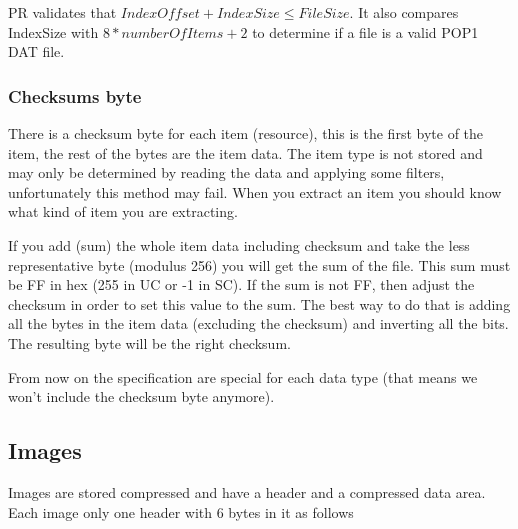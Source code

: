 \documentclass{article}
\begin{document}

%
%

  PR validates that $IndexOffset+IndexSize \le FileSize$.
 It also compares IndexSize with $8*numberOfItems+2$ to determine if a file
  is a valid POP1 DAT file.

\subsubsection{Checksums byte}

 There is a  checksum byte for each item (resource), this is the first byte
 of the item, the rest of the bytes are the item data. The item type is not
 stored and may only be determined by reading the data and applying some
 filters, unfortunately this method may fail. When you extract an item you
 should know what kind of item you are extracting.

 If you add (sum) the whole item data including checksum and take the less
 representative byte (modulus 256) you will get the sum of the file. This
 sum must be FF in hex (255 in UC or -1 in SC). If the sum is not FF, then
 adjust the checksum in order to set this value to the sum. The best way
 to do that is adding all the bytes in the item data (excluding the
 checksum) and inverting all the bits. The resulting byte will be the
 right checksum.

 From now on the specification are special for each data type (that means
 we won't include the checksum byte anymore).

\subsection{Images}
 Images are stored compressed and have a header and a compressed data area.
 Each image only one header with 6 bytes in it as follows
\end{document}

